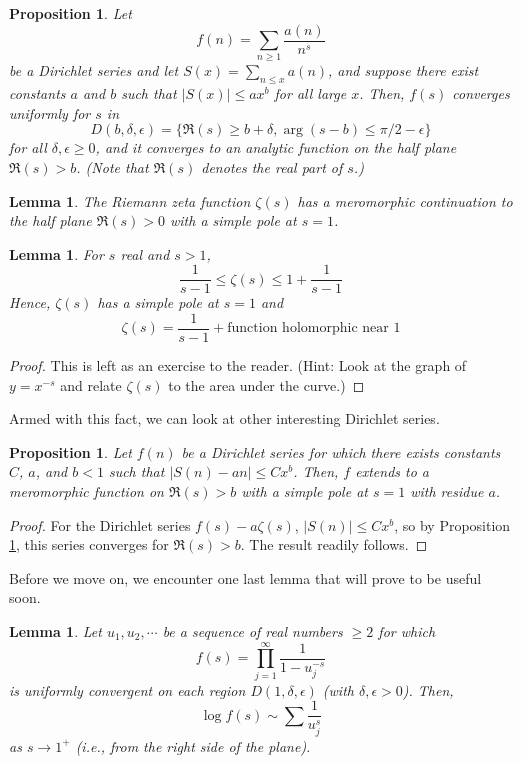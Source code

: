 \documentclass{article}
\theoremstyle{plain}
\newtheorem{prop}[thm]{Proposition}
\newtheorem{lemma}[thm]{Lemma}
\theoremstyle{definition}
\theoremstyle{remark}
\numberwithin{equation}{section}
\numberwithin{thm}{section}
\begin{document}
\begin{prop} \label{2.1}
Let $$f(n) = \sum_{n \ge 1} \frac{a(n)}{n^s}$$ be a Dirichlet series and let $S(x) = \sum_{n \le x} a(n)$, and suppose there exist constants $a$ and $b$ such that $|S(x)| \le ax^b$ for all large $x$. Then, $f(s)$ converges uniformly for $s$ in $$D(b, \delta, \epsilon) = \{\Re(s) \ge b + \delta, \arg(s-b) \le \pi/2 - \epsilon\}$$ for all $\delta, \epsilon \ge 0$, and it converges to an analytic function on the half plane $\Re(s) > b$. (Note that $\Re(s)$ denotes the real part of $s$.)
\end{prop}

\begin{lemma}
The Riemann zeta function $\zeta(s)$ has a meromorphic continuation to the half plane $\Re(s) > 0$ with a simple pole at $s = 1$.
\end{lemma}

\begin{lemma}
For $s$ real and $s > 1$, $$\frac{1}{s-1} \le \zeta(s) \le 1 + \frac{1}{s-1}$$ Hence, $\zeta(s)$ has a simple pole at $s = 1$ and $$\zeta(s) = \frac{1}{s-1} + \text{function holomorphic near } 1$$
\end{lemma}

\begin{proof}
This is left as an exercise to the reader. (Hint: Look at the graph of $y = x^{-s}$ and relate $\zeta(s)$ to the area under the curve.)
\end{proof}

Armed with this fact, we can look at other interesting Dirichlet series. 

\begin{prop}
Let $f(n)$ be a Dirichlet series for which there exists constants $C$, $a$, and $b < 1$ such that $|S(n) - an| \le Cx^b$. Then, $f$ extends to a meromorphic function on $\Re(s) > b$ with a simple pole at $s = 1$ with residue $a$. 
\end{prop}

\begin{proof}
For the Dirichlet series $f(s) - a\zeta(s)$, $|S(n)| \le Cx^b$, so by Proposition \ref{2.1}, this series converges for $\Re(s) > b$. The result readily follows.  
\end{proof}

Before we move on, we encounter one last lemma that will prove to be useful soon.

\begin{lemma} \label{2.5}
Let $u_1, u_2, \cdots$ be a sequence of real numbers $\ge 2$ for which $$f(s) = \prod_{j = 1}^{\infty} \frac{1}{1 - u_{j}^{-s}}$$ is uniformly convergent on each region $D(1, \delta, \epsilon)$ (with $\delta, \epsilon > 0$). Then, $$\log f(s) \sim \sum \frac{1}{u_{j}^{s}}$$ as $s \to 1^{+}$ (i.e., from the right side of the plane). 
\end{lemma}
\end{document}
